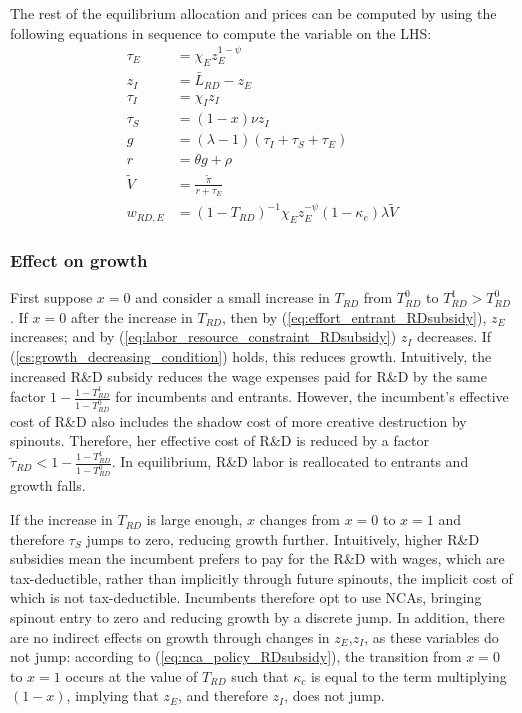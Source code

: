 \documentclass[11pt,english]{article}
\theoremstyle{remark}
\begin{document}
The rest of the equilibrium allocation and prices can be computed by using the following equations in sequence to compute the variable on the LHS:
\begin{align}
	\tau_E &= \chi_E z_E^{1-\psi} \\
	z_I &= \bar{L}_{RD} - z_E \label{eq:labor_resource_constraint_RDsubsidy}\\ 
	\tau_I &= \chi_I z_I \\
	\tau_S &= (1-x) \nu z_I \\
	g &= (\lambda - 1) (\tau_I + \tau_S + \tau_E) \\
	r &= \theta g + \rho \\
	\tilde{V} &= \frac{\tilde{\pi}}{r + \tau_E} \\ 
	w_{RD,E} &= (1-T_{RD})^{-1}\chi_E z_E^{-\psi} (1-\kappa_e) \lambda \tilde{V} \label{eq:wage_rd_labor_RDsubsidy}
\end{align}

\subsubsection{Effect on growth}

First suppose $x = 0$ and consider a small increase in $T_{RD}$ from $T_{RD}^0$ to $T_{RD}^1 > T_{RD}^0$. If $x = 0$ after the increase in $T_{RD}$, then by (\ref{eq:effort_entrant_RDsubsidy}), $z_E$ increases; and by (\ref{eq:labor_resource_constraint_RDsubsidy}) $z_I$ decreases. If (\ref{cs:growth_decreasing_condition}) holds, this reduces growth. Intuitively, the increased R\&D subsidy reduces the wage expenses paid for R\&D by the same factor $1-\frac{1-T_{RD}^1}{1-T_{RD}^0}$ for incumbents and entrants. However, the incumbent's effective cost of R\&D also includes the shadow cost of more creative destruction by spinouts. Therefore, her effective cost of R\&D is reduced by a factor $\tilde{\tau}_{RD} < 1-\frac{1-T_{RD}^1}{1-T_{RD}^0}$. In equilibrium, R\&D labor is reallocated to entrants and growth falls.

If the increase in $T_{RD}$ is large enough, $x$ changes from $x = 0$ to $x = 1$ and therefore $\tau_S$ jumps to zero, reducing growth further. Intuitively, higher R\&D subsidies mean the incumbent prefers to pay for the R\&D with wages, which are tax-deductible, rather than implicitly through future spinouts, the implicit cost of which is not tax-deductible. Incumbents therefore opt to use NCAs, bringing spinout entry to zero and reducing growth by a discrete jump. In addition, there are no indirect effects on growth through changes in $z_E$,$z_I$, as these variables do not jump: according to (\ref{eq:nca_policy_RDsubsidy}), the transition from $x= 0$ to $x =1$ occurs at the value of $T_{RD}$ such that $\kappa_c$ is equal to the term multiplying $(1-x)$, implying that $z_E$, and therefore $z_I$, does not jump.
\end{document}
